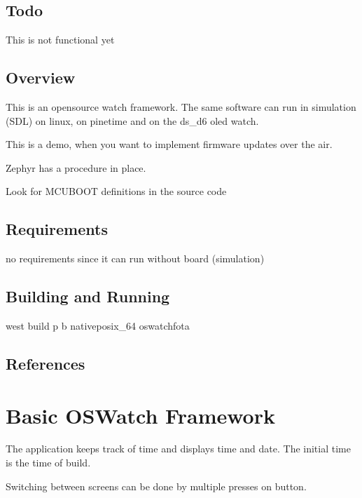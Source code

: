 \documentclass[letterpaper,10pt,english]{sphinxmanual}
\begin{document}
\subsection{Todo}
\label{\detokenize{samples/oswatch-fotaREADME:todo}}
This is not functional yet


\subsection{Overview}
\label{\detokenize{samples/oswatch-fotaREADME:overview}}
This is an opensource watch framework.
The same software can run in simulation (SDL) on linux, on pinetime and on the ds\_d6 oled watch.

This is a demo, when you want to implement firmware updates over the air.

Zephyr has a procedure in place.

Look for MCUBOOT definitions in the source code


\subsection{Requirements}
\label{\detokenize{samples/oswatch-fotaREADME:requirements}}
no requirements since it can run without board (simulation)


\subsection{Building and Running}
\label{\detokenize{samples/oswatch-fotaREADME:building-and-running}}
west build \sphinxhyphen{}p \sphinxhyphen{}b  native\sphinxhyphen{}posix\_64 oswatch\sphinxhyphen{}fota


\subsection{References}
\label{\detokenize{samples/oswatch-fotaREADME:references}}

\section{Basic OSWatch Framework}
\label{\detokenize{samples/oswatchREADME:basic-oswatch-framework}}\label{\detokenize{samples/oswatchREADME:oswatch}}\label{\detokenize{samples/oswatchREADME::doc}}
The application keeps track of time and displays time and date.
The initial time is the time of build.

Switching between screens can be done by multiple presses on button.
\end{document}
